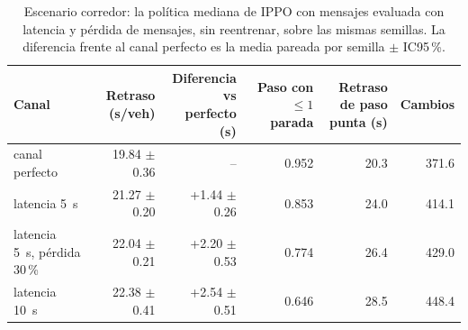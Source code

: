 \begin{table}[H]
\centering
\scriptsize
\setlength{\tabcolsep}{3pt}
\begin{tabular}{lrrrrr}
\toprule
Canal & Retraso (s/veh) & \makecell{Diferencia vs\\perfecto (s)} & \makecell{Paso con\\$\le 1$ parada} & \makecell{Retraso de paso\\punta (s)} & Cambios \\
\midrule
canal perfecto & 19.84 $\pm$ 0.36 & -- & 0.952 & 20.3 & 371.6 \\
latencia 5~s & 21.27 $\pm$ 0.20 & +1.44 $\pm$ 0.26 & 0.853 & 24.0 & 414.1 \\
latencia 5~s, pérdida 30\,\% & 22.04 $\pm$ 0.21 & +2.20 $\pm$ 0.53 & 0.774 & 26.4 & 429.0 \\
latencia 10~s & 22.38 $\pm$ 0.41 & +2.54 $\pm$ 0.51 & 0.646 & 28.5 & 448.4 \\
\bottomrule
\end{tabular}
\caption[Escenario corredor: IPPO con mensajes y canal imperfecto]{Escenario corredor: la política mediana de IPPO con mensajes evaluada con latencia y pérdida de mensajes, sin reentrenar, sobre las mismas semillas. La diferencia frente al canal perfecto es la media pareada por semilla $\pm$ IC95\,\%.}
\label{tab:corredor-s1}
\end{table}
